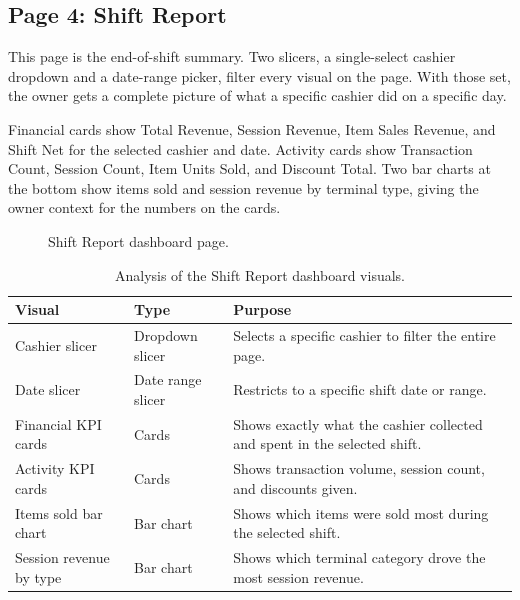 \documentclass[12pt, a4paper]{report}
\begin{document}
\subsection{Page 4: Shift Report}

This page is the end-of-shift summary. Two slicers, a single-select cashier
dropdown and a date-range picker, filter every visual on the page. With those
set, the owner gets a complete picture of what a specific cashier did on a
specific day.

Financial cards show Total Revenue, Session Revenue, Item Sales Revenue, and Shift
Net for the selected cashier and date. Activity cards show Transaction Count, Session
Count, Item Units Sold, and Discount Total. Two bar charts at the bottom show items
sold and session revenue by terminal type, giving the owner context for the numbers
on the cards.

\begin{figure}[H]
  \centering
  \caption{Shift Report dashboard page.\label{fig:dash_shift}}
\end{figure}

\begin{table}[H]
  \centering
  \caption{Analysis of the Shift Report dashboard visuals.\label{tab:shift_analysis}}
  \begin{tabular}{p{3.5cm} p{2.5cm} p{7cm}}
    \toprule
    \textbf{Visual} & \textbf{Type} & \textbf{Purpose} \\
    \midrule
    Cashier slicer
      & Dropdown slicer
      & Selects a specific cashier to filter the entire page. \\[4pt]
    Date slicer
      & Date range slicer
      & Restricts to a specific shift date or range. \\[4pt]
    Financial KPI cards
      & Cards
      & Shows exactly what the cashier collected and spent in the selected shift. \\[4pt]
    Activity KPI cards
      & Cards
      & Shows transaction volume, session count, and discounts given. \\[4pt]
    Items sold bar chart
      & Bar chart
      & Shows which items were sold most during the selected shift. \\[4pt]
    Session revenue by type
      & Bar chart
      & Shows which terminal category drove the most session revenue. \\
    \bottomrule
  \end{tabular}
\end{table}
\end{document}
